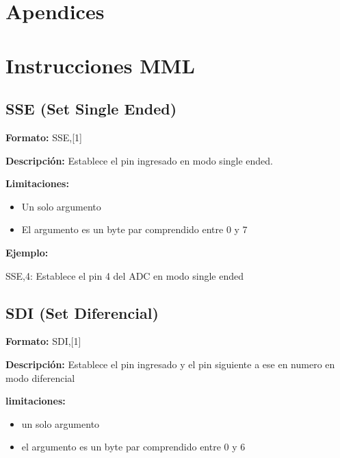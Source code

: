 \documentclass{article}
\theoremstyle{definition}
\theoremstyle{remark}
\begin{document}
\clearpage


\section{Apendices} %
\label{sec:apendices}


\appendix
\section{Instrucciones MML} %
\label{sec:instrucciones_mml}


\subsection{SSE (Set Single Ended)} %
\label{sub:sse_set_single_ended}


\textbf{Formato:} SSE,[1]

\textbf{Descripción:}
Establece el pin ingresado en modo single ended.

\textbf{Limitaciones:}
\begin{itemize}
  \item Un solo argumento
  \item El argumento es un byte par comprendido entre 0 y 7
\end{itemize}

\textbf{Ejemplo:}

SSE,4: Establece el pin 4 del ADC en modo single ended


\subsection{SDI (Set Diferencial)} %
\label{sub:sdi_set_diferencial}


\textbf{Formato:} SDI,[1]

\textbf{Descripción:}
Establece el pin ingresado y el pin siguiente a ese en numero en modo diferencial

\textbf{limitaciones:}
\begin{itemize}
  \item un solo argumento
  \item el argumento es un byte par comprendido entre 0 y 6
\end{itemize}
\end{document}
